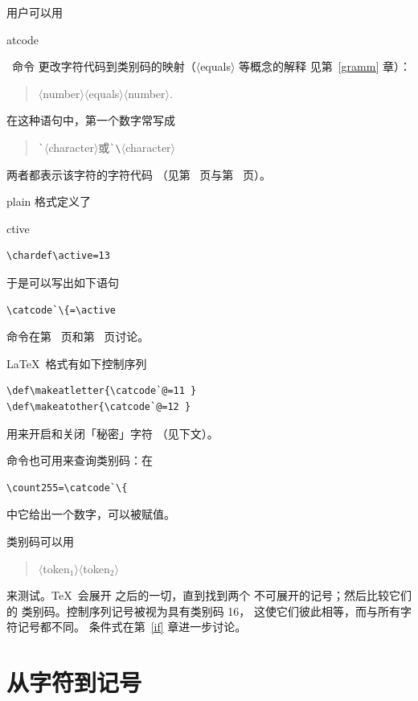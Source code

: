 \documentclass[a4paper]{rapport3}
\makeatletter
\def\gr#1{$\langle$#1$\rangle$}\def\key#1{{\tt#1}}
\newenvironment{disp}{\begin{quotation}}{\end{quotation}}
\def\gram#1{\gr{#1}}%
\def\cstoidx#1\par{\index{#1@\cs{#1}}}
\def\csterm#1\par{\cstoidx #1\par\cs{#1}}
\makeatother
\begin{document}
用户可以用 \cstoidx catcode\par\ 命令
更改字符代码到类别码的映射（\gr{equals} 等概念的解释
见第~\ref{gramm} 章）：
\begin{disp}\gram{number}\gr{equals}\gram{number}.\end{disp}
在这种语句中，第一个数字常写成
\begin{disp}\verb>`>\gr{character}\quad 或\quad \verb>`\>\gr{character}\end{disp}
两者都表示该字符的字符代码
（见第~\pageref{char:code} 页与第~\pageref{int:denotation} 页）。

plain 格式定义了
\csterm active\par
\begin{verbatim}
\chardef\active=13
\end{verbatim}
于是可以写出如下语句
\begin{verbatim}
\catcode`\{=\active
\end{verbatim}
 命令在第~\pageref{chardef} 页和第~\pageref{num:chardef} 页讨论。

\LaTeX\ 格式有如下控制序列
\begin{verbatim}
\def\makeatletter{\catcode`@=11 }
\def\makeatother{\catcode`@=12 }
\end{verbatim}
用来开启和关闭「秘密」字符 \n@
（见下文）。
\awp

 命令也可用来查询类别码：在
\begin{verbatim}
\count255=\catcode`\{
\end{verbatim}
中它给出一个数字，可以被赋值。

类别码可以用
\begin{disp}\gr{token$_1$}\gr{token$_2$}\end{disp}
来测试。\TeX\ 会展开  之后的一切，直到找到两个
不可展开的记号；然后比较它们的
类别码。控制序列记号被视为具有类别码 16，
这使它们彼此相等，而与所有字符记号都不同。
条件式在第~\ref{if} 章进一步讨论。

\section{从字符到记号}
\end{document}
